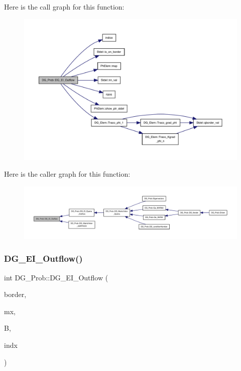 Here is the call graph for this function\+:
\nopagebreak
\begin{figure}[H]
\begin{center}
\leavevmode
\includegraphics[width=350pt]{classDG__Prob_a5aa1654fb60cabf97719e65ba9302cf4_cgraph}
\end{center}
\end{figure}
Here is the caller graph for this function\+:
\nopagebreak
\begin{figure}[H]
\begin{center}
\leavevmode
\includegraphics[width=350pt]{classDG__Prob_a5aa1654fb60cabf97719e65ba9302cf4_icgraph}
\end{center}
\end{figure}
\mbox{\label{classDG__Prob_a3e99ae33818db46884cd2683c741f36c}} 
\subsubsection{\texorpdfstring{D\+G\+\_\+\+E\+I\+\_\+\+Outflow()}{DG\_EI\_Outflow()}\hspace{0.1cm}{\footnotesize\ttfamily [2/2]}}
{\footnotesize\ttfamily int D\+G\+\_\+\+Prob\+::\+D\+G\+\_\+\+E\+I\+\_\+\+Outflow (\begin{DoxyParamCaption}\item[{const \hyperlink{structEDGE}{E\+D\+GE}}]{border,  }\item[{double $\ast$}]{mx,  }\item[{double $\ast$}]{B,  }\item[{int $\ast$}]{indx }\end{DoxyParamCaption})}



